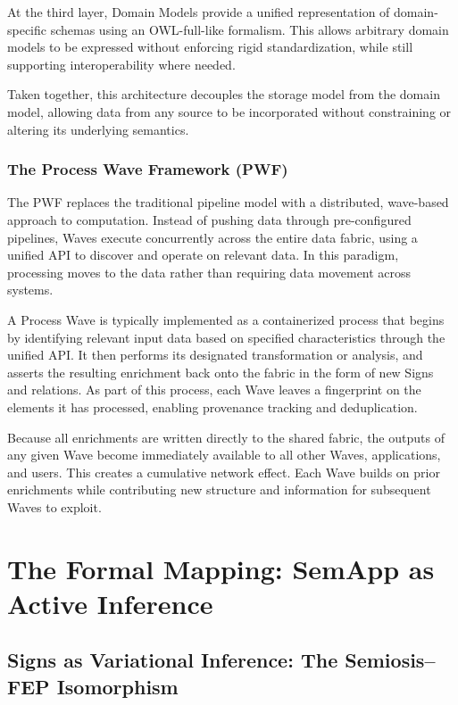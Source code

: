 \documentclass[11pt,a4paper]{article}
\theoremstyle{definition}
\begin{document}
At the third layer, Domain Models provide a unified representation of domain-specific schemas using an OWL-full-like formalism. This allows arbitrary domain models to be expressed without enforcing rigid standardization, while still supporting interoperability where needed.

Taken together, this architecture decouples the storage model from the domain model, allowing data from any source to be incorporated without constraining or altering its underlying semantics.

\subsubsection{The Process Wave Framework (PWF)}

The PWF replaces the traditional pipeline model with a distributed, wave-based approach to computation. Instead of pushing data through pre-configured pipelines, Waves execute concurrently across the entire data fabric, using a unified API to discover and operate on relevant data. In this paradigm, processing moves to the data rather than requiring data movement across systems.

A Process Wave is typically implemented as a containerized process that begins by identifying relevant input data based on specified characteristics through the unified API. It then performs its designated transformation or analysis, and asserts the resulting enrichment back onto the fabric in the form of new Signs and relations. As part of this process, each Wave leaves a fingerprint on the elements it has processed, enabling provenance tracking and deduplication.

Because all enrichments are written directly to the shared fabric, the outputs of any given Wave become immediately available to all other Waves, applications, and users. This creates a cumulative network effect. Each Wave builds on prior enrichments while contributing new structure and information for subsequent Waves to exploit.

\section{The Formal Mapping: SemApp as Active Inference}
\label{sec:formal}

\subsection{Signs as Variational Inference: The Semiosis--FEP Isomorphism}
\label{sec:signs_vfe}
\end{document}
